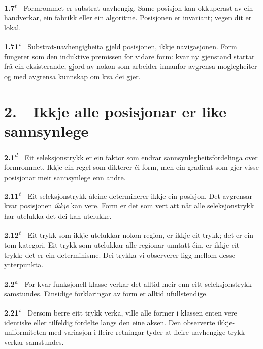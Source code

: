 \documentclass[10pt]{article}
\begin{document}
\noindent\textbf{1.7}\textsuperscript{\textit{t}}~~Formrommet er substrat-uavhengig. Same posisjon kan okkuperast av ein handverkar, ein fabrikk eller ein algoritme. Posisjonen er invariant; vegen dit er lokal.




\noindent\textbf{1.71}\textsuperscript{\textit{t}}~~Substrat-uavhengigheita gjeld posisjonen, ikkje navigasjonen. Form fungerer som den induktive premissen for vidare form: kvar ny gjenstand startar frå ein eksisterande, gjord av nokon som arbeider innanfor avgrensa moglegheiter og med avgrensa kunnskap om kva dei gjer.







\chapter*{2.~~Ikkje alle posisjonar er like sannsynlege}




\noindent\textbf{2.1}\textsuperscript{\textit{d}}~~Eit seleksjonstrykk er ein faktor som endrar sannsynlegheitsfordelinga over formrommet. Ikkje ein regel som dikterer éi form, men ein gradient som gjer visse posisjonar meir sannsynlege enn andre.




\noindent\textbf{2.11}\textsuperscript{\textit{t}}~~Eit seleksjonstrykk åleine determinerer ikkje ein posisjon. Det avgrensar kvar posisjonen \textit{ikkje} kan vere. Form er det som vert att når alle seleksjonstrykk har utelukka det dei kan utelukke.




\noindent\textbf{2.12}\textsuperscript{\textit{t}}~~Eit trykk som ikkje utelukkar nokon region, er ikkje eit trykk; det er ein tom kategori. Eit trykk som utelukkar alle regionar unntatt éin, er ikkje eit trykk; det er ein determinisme. Dei trykka vi observerer ligg mellom desse ytterpunkta.




\noindent\textbf{2.2}\textsuperscript{\textit{a}}~~For kvar funksjonell klasse verkar det alltid meir enn eitt seleksjonstrykk samstundes. Einsidige forklaringar av form er alltid ufullstendige.




\noindent\textbf{2.21}\textsuperscript{\textit{t}}~~Dersom berre eitt trykk verka, ville alle former i klassen enten vere identiske eller tilfeldig fordelte langs den eine aksen. Den observerte ikkje-uniformiteten med variasjon i fleire retningar tyder at fleire uavhengige trykk verkar samstundes.
\end{document}

